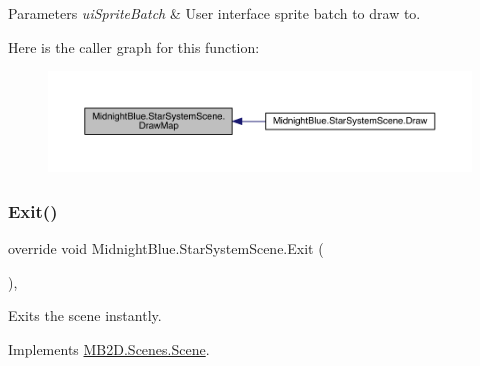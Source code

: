\begin{DoxyParams}{Parameters}
{\em ui\+Sprite\+Batch} & User interface sprite batch to draw to.\\
\hline
\end{DoxyParams}
Here is the caller graph for this function\+:
\nopagebreak
\begin{figure}[H]
\begin{center}
\leavevmode
\includegraphics[width=350pt]{class_midnight_blue_1_1_star_system_scene_a8ce5e552f65d43e0326644e069dc6c24_icgraph}
\end{center}
\end{figure}
\hypertarget{class_midnight_blue_1_1_star_system_scene_ad533ba93e597964d015099031a85cb77}{}\label{class_midnight_blue_1_1_star_system_scene_ad533ba93e597964d015099031a85cb77} 
\subsubsection{\texorpdfstring{Exit()}{Exit()}}
{\footnotesize\ttfamily override void Midnight\+Blue.\+Star\+System\+Scene.\+Exit (\begin{DoxyParamCaption}{ }\end{DoxyParamCaption})\hspace{0.3cm}{\ttfamily [inline]}, {\ttfamily [virtual]}}



Exits the scene instantly. 



Implements \hyperlink{class_m_b2_d_1_1_scenes_1_1_scene_a099b79e16d23b67349847999d2336813}{M\+B2\+D.\+Scenes.\+Scene}.

\hypertarget{class_midnight_blue_1_1_star_system_scene_a9fd64901322082a4da8658650257163d}{}\label{class_midnight_blue_1_1_star_system_scene_a9fd64901322082a4da8658650257163d} 
